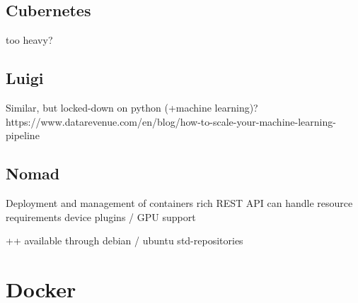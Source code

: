 \subsection{Cubernetes}

too heavy?

\subsection{Luigi}

Similar, but locked-down on python  (+machine learning)?
https://www.datarevenue.com/en/blog/how-to-scale-your-machine-learning-pipeline

\subsection{Nomad}

Deployment and management of containers
rich REST API
can handle resource requirements
device plugins / GPU support

++ available through debian / ubuntu std-repositories

\section{Docker}
